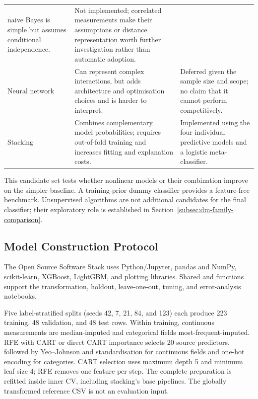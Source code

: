 \begin{table}[H]
\begin{tabularx}{\textwidth}{@{}p{2.7cm}XX@{}}
naive Bayes is simple but assumes conditional independence. &
Not implemented; correlated measurements make their assumptions or distance
representation worth further investigation rather than automatic adoption. \\
Neural network &
Can represent complex interactions, but adds architecture and optimisation
choices and is harder to interpret. &
Deferred given the sample size and scope; no claim that it cannot perform
competitively. \\
Stacking &
Combines complementary model probabilities; requires out-of-fold training
and increases fitting and explanation costs. &
Implemented using the four individual predictive models and a logistic
meta-classifier. \\
\bottomrule
\end{tabularx}
\end{table}

This candidate set tests whether nonlinear models or their combination improve
on the simpler baseline. A training-prior dummy classifier provides a
feature-free benchmark. Unsupervised algorithms are not additional candidates
for the final classifier; their exploratory role is established in
Section~\ref{subsec:dm-family-comparison}.

\subsection{Model Construction Protocol}
\label{subsec:python-candidate-construction}

The Open Source Software Stack uses Python/Jupyter, pandas and NumPy,
scikit-learn, XGBoost, LightGBM, and plotting libraries. Shared
 and  functions support the transformation,
holdout, leave-one-out, tuning, and error-analysis notebooks.

Five label-stratified splits (seeds 42, 7, 21, 84, and 123) each produce
223 training, 48 validation, and 48 test rows. Within training, continuous
measurements are median-imputed and categorical fields most-frequent-imputed.
RFE with CART or direct CART importance selects 20 source predictors, followed
by Yeo--Johnson and standardisation for continuous fields and one-hot encoding
for categories. CART selection uses maximum depth 5 and minimum leaf size 4;
RFE removes one feature per step. The complete preparation is refitted inside
inner CV, including stacking's base pipelines. The globally transformed
reference CSV is not an evaluation input.

